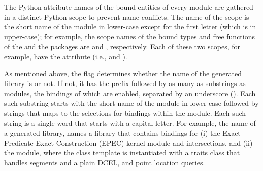 The Python attribute names of the bound entities of every module are
gathered in a distinct Python scope to prevent name conflicts. The
name of the scope is the short name of the module in lower-case except
for the first letter (which is in upper-case); for example, the scope
names of the bound types and free functions of
the \iiDArrangementsPackage{} and the \iiiDTriangulationsPackage{}
packages are  and
, respectively. Each of these two scopes, for
example, have the attribute  (i.e.,
 and
).

As mentioned above, the \cmake{} flag
 determines whether the name
of the generated library is  or not. If not, it
has the prefix  followed by as many as substrings
as modules, the bindings of which are enabled, separated by an
underscore (\myLstinline{_}). Each such substring starts with the
short name of the module in lower case followed by strings that maps
to the selections for bindings within the module. Each such string is
a single word that starts with a capital letter. For example, the name
 of a generated
library, names a library that contains bindings for (i) the
Exact-Predicate-Exact-Construction (EPEC) kernel module and
intersections, and (ii) the \iiDArrangementsPackage{} module, where
the  class template is instantiated with
a traits class that handles segments and a plain DCEL, and point
location queries.

